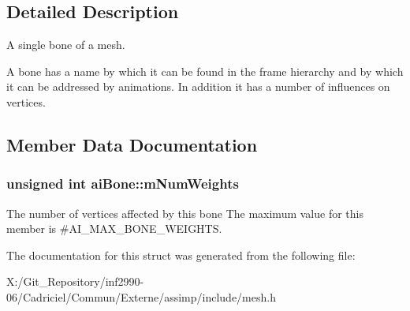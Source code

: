 \subsection{Detailed Description}
A single bone of a mesh. 

A bone has a name by which it can be found in the frame hierarchy and by which it can be addressed by animations. In addition it has a number of influences on vertices. 

\subsection{Member Data Documentation}
\hypertarget{structai_bone_a87a79d42a0132753aac66397ad6f9b71}{
\subsubsection[{m\-Num\-Weights}]{\setlength{\rightskip}{0pt plus 5cm}unsigned int ai\-Bone\-::m\-Num\-Weights}}\label{structai_bone_a87a79d42a0132753aac66397ad6f9b71}
The number of vertices affected by this bone The maximum value for this member is \#\-A\-I\-\_\-\-M\-A\-X\-\_\-\-B\-O\-N\-E\-\_\-\-W\-E\-I\-G\-H\-T\-S. 

The documentation for this struct was generated from the following file\-:\begin{DoxyCompactItemize}
\item 
X\-:/\-Git\-\_\-\-Repository/inf2990-\/06/\-Cadriciel/\-Commun/\-Externe/assimp/include/mesh.\-h\end{DoxyCompactItemize}
